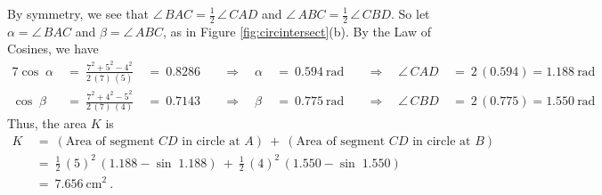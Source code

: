 \begin{exmp}
By symmetry, we see that $\angle\,BAC = \frac{1}{2}\,\angle\,CAD$ and
$\angle\,ABC = \frac{1}{2}\,\angle\,CBD$. So let $\alpha = \angle\,BAC$ and $\beta = \angle\,ABC$,
as in Figure \ref{fig:circintersect}(b). By the Law of Cosines, we have
\begin{alignat*}{7}
 \cos\;\alpha ~&=~ \frac{7^2 + 5^2 - 4^2}{2\,(7)\,(5)} ~&=~ 0.8286 \quad&\Rightarrow\quad
 \alpha ~&=~ 0.594~\text{rad} \quad&\Rightarrow\quad \angle\,CAD ~&=~2\,(0.594) = 1.188~\text{rad}\\
 \cos\;\beta ~&=~ \frac{7^2 + 4^2 - 5^2}{2\,(7)\,(4)} ~&=~ 0.7143 \quad&\Rightarrow\quad
 \beta ~&=~ 0.775~\text{rad} \quad&\Rightarrow\quad \angle\,CBD ~&=~ 2\,(0.775) = 1.550~\text{rad}
\end{alignat*}
Thus, the area $K$ is
\begin{align*}
 K ~&=~ (\text{Area of segment $CD$ in circle at $A$}) ~+~
  (\text{Area of segment $CD$ in circle at $B$})\\
 &=~ \tfrac{1}{2}\,(5)^2 \,(1.188 - \sin\;1.188) ~+~ \tfrac{1}{2}\,(4)^2 \,(1.550 - \sin\;1.550)\\
 &=~ \boxed{7.656~\text{cm}^2} ~.
\end{align*}
\end{exmp}\vspace{-4mm}
\divider
\vspace{2mm}

